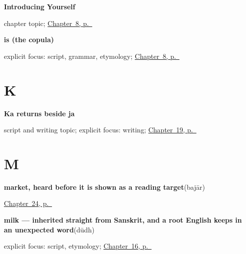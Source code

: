 \noindent\begin{minipage}[t]{\linewidth}
\raggedright
\textbf{Introducing Yourself}\par
\footnotesize chapter topic; \hyperref[ch:introductions]{Chapter~8, p.~\pageref*{ch:introductions}}
\end{minipage}\par\smallskip

\noindent\begin{minipage}[t]{\linewidth}
\raggedright
\textbf{is (the copula)}\enspace\emph{}\par
\footnotesize explicit focus: script, grammar, etymology; \hyperref[ch:introductions]{Chapter~8, p.~\pageref*{ch:introductions}}
\end{minipage}\par\smallskip

\section*{K}

\noindent\begin{minipage}[t]{\linewidth}
\raggedright
\textbf{Ka returns beside ja}\par
\footnotesize script and writing topic; explicit focus: writing; \hyperref[ch:gu-r4-script-names]{Chapter~19, p.~\pageref*{ch:gu-r4-script-names}}
\end{minipage}\par\smallskip

\section*{M}

\noindent\begin{minipage}[t]{\linewidth}
\raggedright
\textbf{market, heard before it is shown as a reading target}\enspace\emph{}\enspace(bajār)\par
\footnotesize \hyperref[ch:gu-first-three-places]{Chapter~24, p.~\pageref*{ch:gu-first-three-places}}
\end{minipage}\par\smallskip

\noindent\begin{minipage}[t]{\linewidth}
\raggedright
\textbf{milk — inherited straight from Sanskrit, and a root English keeps in an unexpected word}\enspace\emph{}\enspace(dūdh)\par
\footnotesize explicit focus: script, etymology; \hyperref[ch:gu-request-food-drink]{Chapter~16, p.~\pageref*{ch:gu-request-food-drink}}
\end{minipage}\par\smallskip

